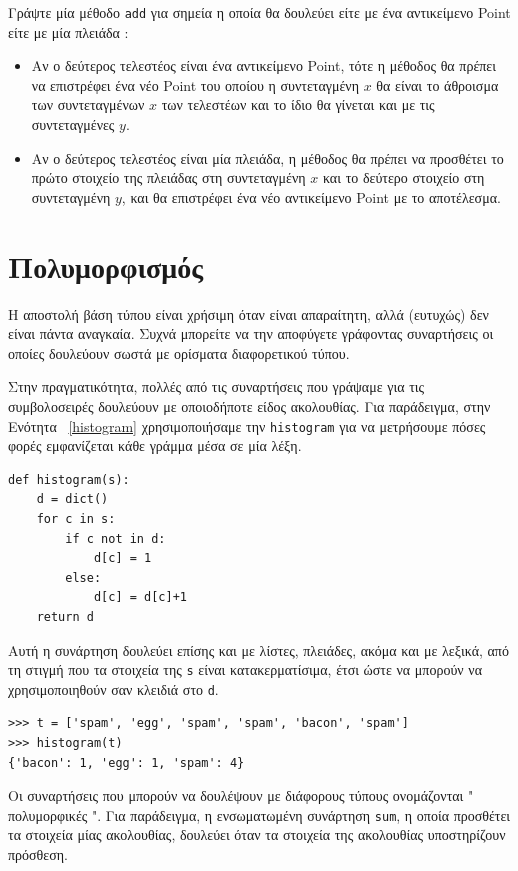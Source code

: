 \documentclass[10pt]{book}
\begin{document}
\begin{exercise}

Γράψτε μία μέθοδο  {\tt add}  για σημεία η οποία θα δουλεύει είτε με ένα 
αντικείμενο  Point  είτε με μία πλειάδα :

\begin{itemize}

 
\item Αν ο δεύτερος τελεστέος είναι ένα αντικείμενο  Point,  τότε η μέθοδος θα 
πρέπει να επιστρέφει ένα νέο  Point  του οποίου η συντεταγμένη $x$ θα είναι το 
άθροισμα των συντεταγμένων  $x$  των τελεστέων και το ίδιο θα γίνεται και με τις 
συντεταγμένες $y$.

\item Αν ο δεύτερος τελεστέος είναι μία πλειάδα, η μέθοδος θα πρέπει να προσθέτει το 
πρώτο στοιχείο της πλειάδας στη συντεταγμένη $x$ και το δεύτερο στοιχείο στη συντεταγμένη 
$y$, και θα επιστρέφει ένα νέο αντικείμενο  Point  με το αποτέλεσμα. 

\end{itemize}
\end{exercise}

 
\section{Πολυμορφισμός}

Η αποστολή βάση τύπου είναι χρήσιμη όταν είναι απαραίτητη, αλλά (ευτυχώς) δεν είναι πάντα 
αναγκαία.  Συχνά μπορείτε να την αποφύγετε γράφοντας συναρτήσεις οι οποίες δουλεύουν 
σωστά με ορίσματα διαφορετικού τύπου.

Στην πραγματικότητα, πολλές από τις συναρτήσεις που γράψαμε για τις συμβολοσειρές  δουλεύουν με οποιοδήποτε είδος ακολουθίας. 
Για παράδειγμα, στην Ενότητα~ \ref{histogram}  χρησιμοποιήσαμε την  {\tt histogram}  για να μετρήσουμε πόσες φορές εμφανίζεται κάθε γράμμα μέσα σε μία λέξη.
 

\begin{verbatim}
def histogram(s):
    d = dict()
    for c in s:
        if c not in d:
            d[c] = 1
        else:
            d[c] = d[c]+1
    return d
\end{verbatim}
%
 Αυτή η συνάρτηση δουλεύει επίσης και με λίστες, πλειάδες, ακόμα και με λεξικά, από τη στιγμή που τα στοιχεία της  {\tt s}  είναι κατακερματίσιμα, έτσι ώστε να μπορούν να χρησιμοποιηθούν σαν κλειδιά στο  {\tt d}.

\begin{verbatim}
>>> t = ['spam', 'egg', 'spam', 'spam', 'bacon', 'spam']
>>> histogram(t)
{'bacon': 1, 'egg': 1, 'spam': 4}
\end{verbatim}
%
 Οι συναρτήσεις που μπορούν να δουλέψουν με διάφορους τύπους ονομάζονται  " πολυμορφικές ".   Για παράδειγμα, η ενσωματωμένη συνάρτηση  {\tt sum},  η οποία προσθέτει τα στοιχεία μίας ακολουθίας, δουλεύει όταν τα στοιχεία της ακολουθίας 
υποστηρίζουν πρόσθεση.
\end{document}
